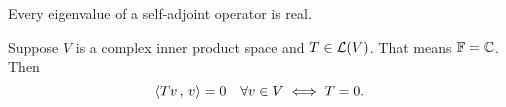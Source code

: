 \begin{thm}
  \label{thm: every eigenvalue of a self-adjoint operator is real}
  Every eigenvalue of a self-adjoint operator is real.
\end{thm}

\begin{thm}[$Tv$ orthogonality to $v$]
  \label{thm: Tv orthogonality to v}
  Suppose $V$ is a complex inner product space and $T \in \mathcal{L}(V)$. That means $\mathbb{F}=\mathbb{C}$. Then
  \[
    \left \langle Tv \, , \, v \right \rangle = 0 \quad \forall v \in V \iff T = 0.
  \]
\end{thm}
